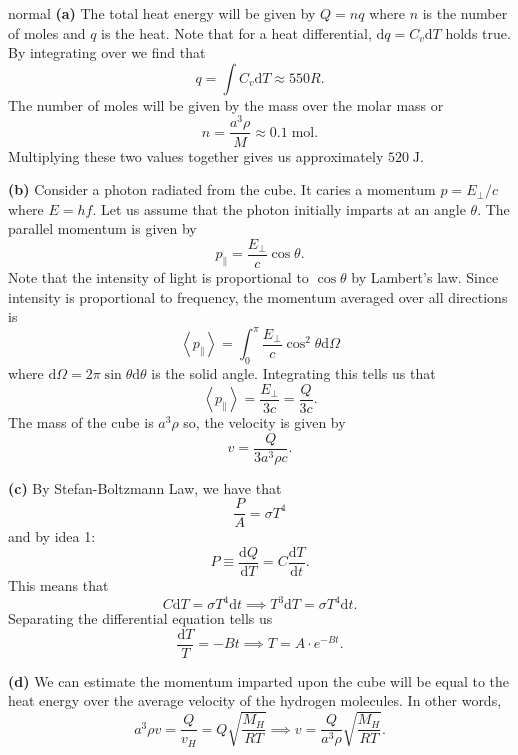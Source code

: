 \begin{solution}{normal}
\textbf{(a)} The total heat energy will be given by $Q = nq$ where $n$ is the number of moles and $q$ is the heat. Note that for a heat differential, $\text{d}q = C_v \text{d}T$ holds true. By integrating over we find that 
\[q = \int C_v \text{d}T \approx 550R.\]
The number of moles will be given by the mass over the molar mass or 
\[n = \frac{a^3 \rho}{M} \approx 0.1 \;\mathrm{mol}.\]
Multiplying these two values together gives us approximately $520\;\mathrm{J}$.
\vspace{3mm}

\noindent \textbf{(b)} Consider a photon radiated from the cube. It caries a momentum $p = E_{\perp}/c$ where $E = hf$. Let us assume that the photon initially imparts at an angle $\theta$. The parallel momentum is given by 
\[p_{\parallel} = \frac{E_{\perp}}{c}\cos\theta.\]
Note that the intensity of light is proportional to $\cos \theta$ by Lambert's law. Since intensity is proportional to frequency, the momentum averaged over all directions is 
\[\left<p_{\parallel}\right> = \int_{0}^{\pi} \frac{E_{\perp}}{c}\cos^2\theta \text{d}\Omega\]
where $\text{d}\Omega = 2\pi \sin \theta \text{d}\theta$ is the solid angle. Integrating this tells us that 
\[\left<p_{\parallel}\right> = \frac{E_{\perp}}{3c} = \frac{Q}{3c}.\]
The mass of the cube is $a^3 \rho$ so, the velocity is given by 
\[v = \frac{Q}{3a^3 \rho c}.\]
\vspace{3mm}

\noindent \textbf{(c)} By Stefan-Boltzmann Law, we have that 
\[\frac{P}{A} = \sigma T^4\]
and by idea 1:  
\[P \equiv \frac{\text{d} Q}{\text{d} T} = C\frac{\text{d} T}{\text{d} t}.\]
This means that 
\[ C \text{d} T = \sigma T^4 \text{d} t\implies T^3 \text{d} T = \sigma T^4 \text{d} t.\]
Separating the differential equation tells us 
\[\frac{\text{d} T}{T} = -Bt \implies T = A\cdot e^{-B t}.\]
\vspace{3mm}

\noindent \textbf{(d)} We can estimate the momentum imparted upon the cube will be equal to the heat energy over the average velocity of the hydrogen molecules. In other words, 
\[a^3 \rho v = \frac{Q}{v_H} = Q\sqrt{\frac{M_H}{RT}}\implies v = \frac{Q}{a^3 \rho}\sqrt{\frac{M_H}{RT}}.\]

\end{solution}